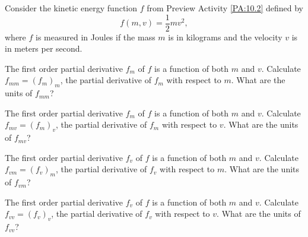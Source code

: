 \begin{pa} \label{PA:10.3} Consider the kinetic energy function $f$ from Preview Activity \ref{PA:10.2} defined by
\[f(m,v) = \frac{1}{2}mv^2,\]
where $f$ is measured in Joules if the mass $m$ is in kilograms and the velocity $v$ is in meters per second.
    \ba
    \item The first order partial derivative $f_m$ of $f$ is a function of both $m$ and $v$. Calculate $f_{mm} = (f_m)_m$, the partial derivative of $f_m$ with respect to $m$. What are the units of $f_{mm}$?

\begin{comment}

Since $f_m(m,v) = \frac{1}{2}v^2$ it follows that $f_{mm}(m,v) = 0$. The units of $f_m$ are $\frac{\text{J}}{\text{k}}$, so the units of $f_{mm}$ are $\frac{\frac{\text{J}}{\text{k}}}{k}$.

\end{comment}

    \item The first order partial derivative $f_m$ of $f$ is a function of both $m$ and $v$. Calculate $f_{mv} = (f_m)_v$, the partial derivative of $f_m$ with respect to $v$. What are the units of $f_{mv}$?

\begin{comment}

Since $f_m(m,v) = \frac{1}{2}v^2$ it follows that $f_{mv}(m,v) = v$. The units of $f_m$ are $\frac{\text{J}}{\text{k}}$, so the units of $f_{mv}$ are $\frac{\frac{\text{J}}{\text{k}}}{m/s}$.

\end{comment}

   \item The first order partial derivative $f_v$ of $f$ is a function of both $m$ and $v$. Calculate $f_{vm} = (f_v)_m$, the partial derivative of $f_v$ with respect to $m$. What are the units of $f_{vm}$?

\begin{comment}

Since $f_v(m,v) = mv$ it follows that $f_{vm}(m,v) = v$. The units of $f_v$ are $\frac{\text{J}}{\text{m/s}}$, so the units of $f_{vm}$ are $\frac{\frac{\text{J}}{\text{m/s}}}{k}$.

\end{comment}

    \item The first order partial derivative $f_v$ of $f$ is a function of both $m$ and $v$. Calculate $f_{vv} = (f_v)_v$, the partial derivative of $f_v$ with respect to $v$. What are the units of $f_{vv}$?


\end{pa}
